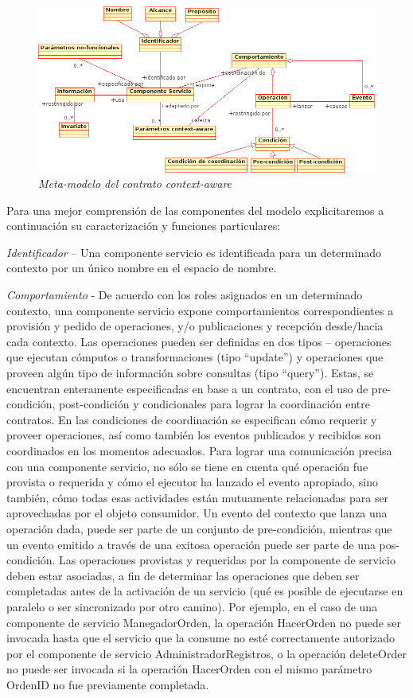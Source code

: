 \documentclass[12 pt,a4paper]{llncs}
\begin{document}
\begin{figure}[!h]
\begin{center}
		\includegraphics[width=5in,totalheight=2in]{contratoca.png}
                \caption{\small \sl Meta-modelo del contrato context-aware} \label{contratoca}
\end{center}
\end{figure}
 

Para una mejor comprensión de las componentes del modelo explicitaremos a continuación su caracterización y funciones particulares: 

\textit{Identificador} – Una componente servicio es identificada para un determinado contexto por un único nombre en el espacio de nombre.

\textit{Comportamiento} -  De acuerdo con los roles asignados en un determinado contexto, una componente servicio expone comportamientos correspondientes a provisión y pedido de operaciones, y/o publicaciones y recepción  desde/hacia cada contexto. Las operaciones pueden ser definidas en dos tipos – operaciones que ejecutan cómputos o transformaciones (tipo “update”) y operaciones que proveen algún tipo de información sobre consultas  (tipo “query”). Estas, se encuentran enteramente especificadas en base a  un contrato, con el uso de pre-condición, post-condición y condicionales para lograr la coordinación entre contratos. En las condiciones de coordinación se especifican cómo requerir y proveer operaciones, así como también los eventos publicados  y recibidos son coordinados en los momentos adecuados. Para lograr una comunicación precisa con una componente servicio, no sólo se tiene en cuenta qué operación fue provista o requerida y cómo el ejecutor ha lanzado el evento apropiado, sino también, cómo todas esas actividades están mutuamente relacionadas para ser aprovechadas por el objeto consumidor. Un evento del contexto que lanza una operación dada, puede ser parte de un conjunto de pre-condición, mientras que un evento emitido a través de una exitosa operación puede ser parte de una pos-condición. 
Las operaciones provistas y requeridas por la componente de servicio deben estar asociadas, a fin de determinar las operaciones que deben ser completadas antes de la activación de un servicio (qué es posible de ejecutarse en paralelo o ser sincronizado por otro camino). Por ejemplo, en el caso de una componente de servicio ManegadorOrden, la operación HacerOrden no puede ser invocada hasta que el servicio que la consume no esté correctamente autorizado por el componente de servicio AdministradorRegistros, o la operación deleteOrder no puede ser invocada si la operación HacerOrden con el mismo parámetro OrdenID no fue previamente completada.
\end{document}
